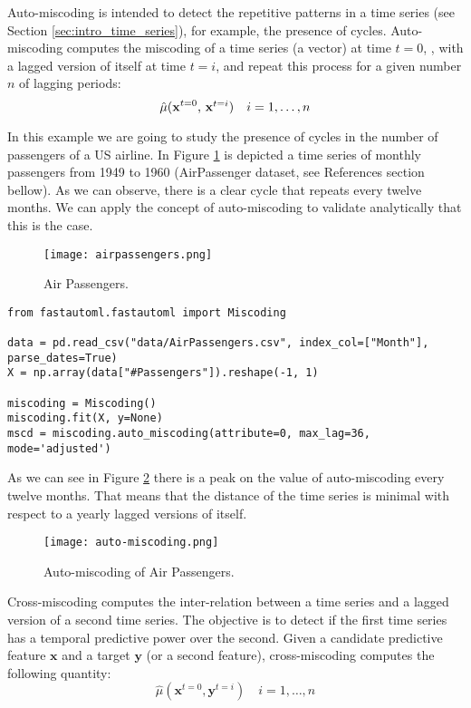 Auto-miscoding is intended to detect the repetitive patterns in a time series (see Section \ref{sec:intro_time_series}), for example, the presence of cycles. Auto-miscoding computes the miscoding of a time series (a vector) at time $t=0$, , with a lagged version of itself at time $t=i$, and repeat this process for a given number $n$ of lagging periods:
\[
\hat\mu(\mathbf{x}^{t=0}$, $\mathbf{x}^{t=i}) \quad i=1,\ldots,n
\]

\begin{example}
In this example we are going to study the presence of cycles in the number of passengers of a US airline. In Figure \ref{figure:air_passengers} is depicted a time series of monthly passengers from 1949 to 1960 (AirPassenger dataset, see References section bellow). As we can observe, there is a clear cycle that repeats every twelve months. We can apply the concept of auto-miscoding to validate analytically that this is the case.

\begin{figure}[h]
\centering
\texttt{[image: airpassengers.png]}
\caption{Air Passengers.}
\label{figure:air_passengers}
\end{figure}

\begin{sourcecode}
{\scriptsize \begin{verbatim}
from fastautoml.fastautoml import Miscoding

data = pd.read_csv("data/AirPassengers.csv", index_col=["Month"], parse_dates=True)
X = np.array(data["#Passengers"]).reshape(-1, 1)

miscoding = Miscoding()
miscoding.fit(X, y=None)
mscd = miscoding.auto_miscoding(attribute=0, max_lag=36, mode='adjusted')
\end{verbatim}}
\end{sourcecode}

As we can see in Figure \ref{figure:auto-miscoding} there is a peak on the value of auto-miscoding every twelve months. That means that the distance of the time series is minimal with respect to a yearly lagged versions of itself.

\begin{figure}[h]
\centering
\texttt{[image: auto-miscoding.png]}
\caption{Auto-miscoding of Air Passengers.}
\label{figure:auto-miscoding}
\end{figure}

\end{example}

Cross-miscoding computes the inter-relation between a time series and a lagged version of a second time series. The objective is to detect if the first time series has a temporal predictive power over the second. Given a candidate predictive feature $\mathbf{x}$ and a target $\mathbf{y}$ (or a second feature), cross-miscoding computes the following quantity:
\[
\hat\mu(\mathbf{x}^{t=0}, \mathbf{y}^{t=i}) \quad i=1,\ldots,n
\]

